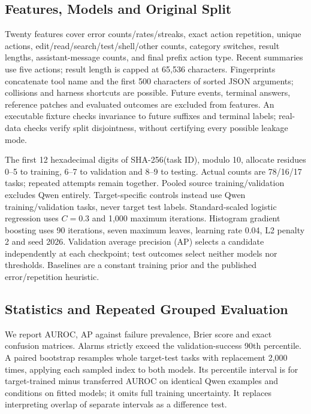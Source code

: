 \documentclass[conference]{IEEEtran}
\begin{document}
\subsection{Features, Models and Original Split}
Twenty features cover error counts/rates/streaks, exact action repetition, unique actions, edit/read/search/test/shell/other counts, category switches, result lengths, assistant-message counts, and final prefix action type. Recent summaries use five actions; result length is capped at 65,536 characters. Fingerprints concatenate tool name and the first 500 characters of sorted JSON arguments; collisions and harness shortcuts are possible. Future events, terminal answers, reference patches and evaluated outcomes are excluded from features. An executable fixture checks invariance to future suffixes and terminal labels; real-data checks verify split disjointness, without certifying every possible leakage mode.

The first 12 hexadecimal digits of SHA-256(task ID), modulo 10, allocate residues 0--5 to training, 6--7 to validation and 8--9 to testing. Actual counts are 78/16/17 tasks; repeated attempts remain together. Pooled source training/validation excludes Qwen entirely. Target-specific controls instead use Qwen training/validation tasks, never target test labels. Standard-scaled logistic regression uses $C=0.3$ and 1,000 maximum iterations. Histogram gradient boosting uses 90 iterations, seven maximum leaves, learning rate 0.04, L2 penalty 2 and seed 2026. Validation average precision (AP) selects a candidate independently at each checkpoint; test outcomes select neither models nor thresholds. Baselines are a constant training prior and the published error/repetition heuristic.

\subsection{Statistics and Repeated Grouped Evaluation}
We report AUROC, AP against failure prevalence, Brier score and exact confusion matrices. Alarms strictly exceed the validation-success 90th percentile. A paired bootstrap resamples whole target-test tasks with replacement 2,000 times, applying each sampled index to both models. Its percentile interval is for target-trained minus transferred AUROC on identical Qwen examples and conditions on fitted models; it omits full training uncertainty. It replaces interpreting overlap of separate intervals as a difference test.
\end{document}
